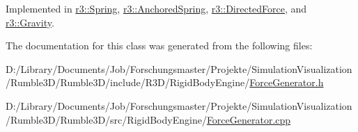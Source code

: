 Implemented in \mbox{\hyperlink{classr3_1_1_spring_a3305adfd568606ed9ae6fb589f20446b}{r3\+::\+Spring}}, \mbox{\hyperlink{classr3_1_1_anchored_spring_a3e928bc7fdedc8eb5b302a007200a58c}{r3\+::\+Anchored\+Spring}}, \mbox{\hyperlink{classr3_1_1_directed_force_ac723ddeef767956d16fb9d0a1d706bfd}{r3\+::\+Directed\+Force}}, and \mbox{\hyperlink{classr3_1_1_gravity_ae3152c6a922ffa193aee362e161cd4a9}{r3\+::\+Gravity}}.



The documentation for this class was generated from the following files\+:\begin{DoxyCompactItemize}
\item 
D\+:/\+Library/\+Documents/\+Job/\+Forschungsmaster/\+Projekte/\+Simulation\+Visualization/\+Rumble3\+D/\+Rumble3\+D/include/\+R3\+D/\+Rigid\+Body\+Engine/\mbox{\hyperlink{_force_generator_8h}{Force\+Generator.\+h}}\item 
D\+:/\+Library/\+Documents/\+Job/\+Forschungsmaster/\+Projekte/\+Simulation\+Visualization/\+Rumble3\+D/\+Rumble3\+D/src/\+Rigid\+Body\+Engine/\mbox{\hyperlink{_force_generator_8cpp}{Force\+Generator.\+cpp}}\end{DoxyCompactItemize}
